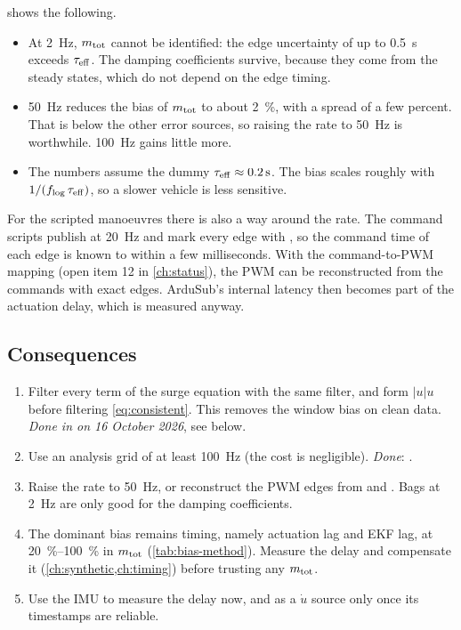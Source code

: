  shows the following.
\begin{itemize}
  \item At \qty{2}{\hertz}, $m_\mathrm{tot}$ cannot be identified: the edge uncertainty of up to
        \qty{0.5}{\second} exceeds $\tau_\mathrm{eff}$. The damping coefficients survive, because they come
        from the steady states, which do not depend on the edge timing.
  \item \qty{50}{\hertz} reduces the bias of $m_\mathrm{tot}$ to about \qty{2}{\percent}, with a spread of a
        few percent. That is below the other error sources, so raising the rate to
        \qty{50}{\hertz} is worthwhile. \qty{100}{\hertz} gains little more.
  \item The numbers assume the dummy $\tau_\mathrm{eff} \approx \qty{0.2}{\second}$. The bias scales
        roughly with $1/(f_\mathrm{log}\,\tau_\mathrm{eff})$, so a slower vehicle is less sensitive.
\end{itemize}
For the scripted manoeuvres there is also a way around the rate. The command scripts publish
 at \qty{20}{\hertz} and mark every edge with , so the
command time of each edge is known to within a few milliseconds. With the command-to-PWM mapping
(open item 12 in \cref{ch:status}), the PWM can be reconstructed from the commands with exact
edges. ArduSub's internal latency then becomes part of the actuation delay, which is measured
anyway.

\subsection{Consequences}
\begin{enumerate}
  \item Filter every term of the surge equation with the same filter, and form $|u|u$ before
        filtering \eqref{eq:consistent}. This removes the window bias on clean data.
        \emph{Done in  on 16 October 2026}, see below.
  \item Use an analysis grid of at least \qty{100}{\hertz} (the cost is negligible).
        \emph{Done}: .
  \item Raise the  rate to \qty{50}{\hertz}, or reconstruct the PWM edges
        from  and . Bags at \qty{2}{\hertz} are only
        good for the damping coefficients.
  \item The dominant bias remains timing, namely actuation lag and EKF lag, at
        \qtyrange{20}{100}{\percent} in $m_\mathrm{tot}$ (\cref{tab:bias-method}). Measure the delay and
        compensate it (\cref{ch:synthetic,ch:timing}) before trusting any $m_\mathrm{tot}$.
  \item Use the IMU to measure the delay now, and as a $\dot u$ source only once its timestamps
        are reliable.
\end{enumerate}

